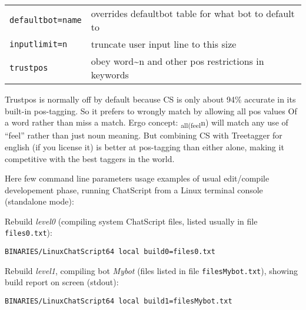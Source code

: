 \documentclass[]{article}
\begin{document}
\begin{longtable}[]{@{}ll@{}}
\begin{minipage}[t]{0.18\columnwidth}\raggedright\strut
\texttt{defaultbot=name}\strut
\end{minipage} & \begin{minipage}[t]{0.76\columnwidth}\raggedright\strut
overrides defaultbot table for what bot to default to\strut
\end{minipage}\tabularnewline
\begin{minipage}[t]{0.18\columnwidth}\raggedright\strut
\texttt{inputlimit=n}\strut
\end{minipage} & \begin{minipage}[t]{0.76\columnwidth}\raggedright\strut
truncate user input line to this size\strut
\end{minipage}\tabularnewline
\begin{minipage}[t]{0.18\columnwidth}\raggedright\strut
\texttt{trustpos}\strut
\end{minipage} & \begin{minipage}[t]{0.76\columnwidth}\raggedright\strut
obey word\textasciitilde{}n and other pos restrictions in keywords\strut
\end{minipage}\tabularnewline
\bottomrule
\end{longtable}

Trustpos is normally off by default because CS is only about 94\%
accurate in its built-in pos-tagging. So it prefers to wrongly match by
allowing all pos values Of a word rather than miss a match. Ergo
concept: \textsubscript{all(feel}n) will match any use of ``feel''
rather than just noun meaning. But combining CS with Treetagger for
english (if you license it) is better at pos-tagging than either alone,
making it competitive with the best taggers in the world.

Here few command line parameters usage examples of usual edit/compile
developement phase, running ChatScript from a Linux terminal console
(standalone mode):

Rebuild \emph{level0} (compiling system ChatScript files, listed usually
in file \texttt{files0.txt}):

\begin{verbatim}
BINARIES/LinuxChatScript64 local build0=files0.txt 
\end{verbatim}

Rebuild \emph{level1}, compiling bot \emph{Mybot} (files listed in file
\texttt{filesMybot.txt}), showing build report on screen (stdout):

\begin{verbatim}
BINARIES/LinuxChatScript64 local build1=filesMybot.txt 
\end{verbatim}
\end{document}
